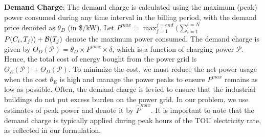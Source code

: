 \noindent \textbf{Demand Charge}: The demand charge is calculated using the maximum (peak) power consumed during any time interval in the billing period, with the demand price denoted as $\theta_D$ (in \$/kW).
Let $P^{max} = \max_{j=1}^{j=end} (\sum_{i=1}^{i=N}$ $P(C_i,T_j)) + \mathcal{B}(T_j)$ denote the maximum power consumed. The demand charge is given by $\Theta_D(\mathcal{P})= \theta_D \times P^{max} \times \delta$, which is a function of charging power  $\mathcal{P}$. Hence, the total cost of energy bought from the power grid is  $\Theta_E(\mathcal{P})+\Theta_D(\mathcal{P})$. To minimize the cost, we must reduce the net power usage when the cost $\theta_E$ is high and manage the power peaks to ensure $P^{max}$ remains as low as possible. Often, the demand charge is levied to ensure that the industrial buildings do not put excess burden on the power grid. In our problem, we use estimates of peak power and denote it by $\hat{P}^{max}$. It is important to note that the demand charge is typically applied during peak hours of the TOU electricity rate, as reflected in our formulation.

